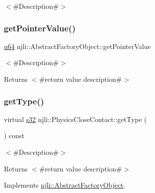 $<$\#\+Description\#$>$ \mbox{\label{classnjli_1_1_physics_close_contact_a4ffddf141a426a5a07d0ac19f1913811}} 
\subsubsection{\texorpdfstring{get\+Pointer\+Value()}{getPointerValue()}}
{\footnotesize\ttfamily \mbox{\hyperlink{_util_8h_ad758b7a5c3f18ed79d2fcd23d9f16357}{u64}} njli\+::\+Abstract\+Factory\+Object\+::get\+Pointer\+Value}

$<$\#\+Description\#$>$

\begin{DoxyReturn}{Returns}
$<$\#return value description\#$>$ 
\end{DoxyReturn}
\mbox{\label{classnjli_1_1_physics_close_contact_ae02df3f3dcb8311bc913c71124b96442}} 
\subsubsection{\texorpdfstring{get\+Type()}{getType()}}
{\footnotesize\ttfamily virtual \mbox{\hyperlink{_util_8h_aa62c75d314a0d1f37f79c4b73b2292e2}{s32}} njli\+::\+Physics\+Close\+Contact\+::get\+Type (\begin{DoxyParamCaption}{ }\end{DoxyParamCaption}) const\hspace{0.3cm}{\ttfamily [virtual]}}

$<$\#\+Description\#$>$

\begin{DoxyReturn}{Returns}
$<$\#return value description\#$>$ 
\end{DoxyReturn}


Implements \mbox{\hyperlink{classnjli_1_1_abstract_factory_object_a207c86146d40d0794708ae7f2d4e60a7}{njli\+::\+Abstract\+Factory\+Object}}.

\mbox{\label{classnjli_1_1_physics_close_contact_a96820db038f8e09a99b52418c5a38f86}} 
